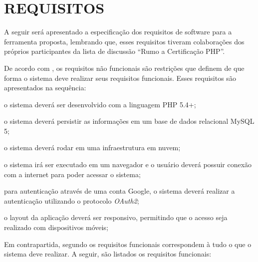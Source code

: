 \section{REQUISITOS}

A seguir será apresentado a especificação dos requisitos de software para a
ferramenta proposta, lembrando que, esses requisitos tiveram colaborações dos
próprios participantes da lista de discussão ``Rumo a Certificação PHP''.

De acordo com
, os
requisitos não funcionais são restrições que definem de que forma o sistema 
deve realizar seus requisitos funcionais. Esses requisitos são apresentados  na
sequência:

\begin{alineas}
	\item o sistema deverá ser desenvolvido com a linguagem PHP 5.4+;
	\item o sistema deverá persistir as informações em um base de dados relacional
	MySQL 5;
	\item o sistema deverá rodar em uma infraestrutura em nuvem;
	\item o sistema irá ser executado em um navegador e o usuário deverá possuir
	conexão com a internet para poder acessar o sistema;
	\item para autenticação através de uma conta Google, o sistema deverá realizar
	a autenticação utilizando o protocolo \textit{OAuth2};
	\item o layout da aplicação deverá ser responsivo, permitindo que o acesso
    seja realizado com dispositivos móveis;
\end{alineas}

Em contrapartida, segundo
 os
requisitos  funcionais correspondem à tudo o que o sistema deve realizar. A
seguir, são listados os requisitos funcionais:

